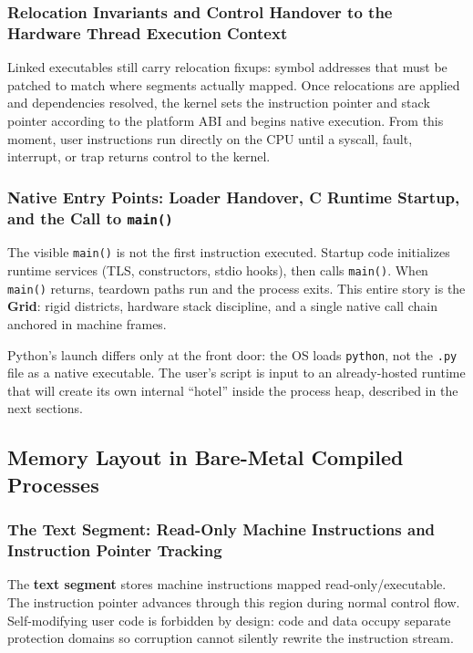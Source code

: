 \documentclass[a4paper,twoside]{report}
\begin{document}
\subsubsection{Relocation Invariants and Control Handover to the Hardware Thread Execution Context}

Linked executables still carry relocation fixups: symbol addresses that must be patched to match where segments actually mapped. Once relocations are applied and dependencies resolved, the kernel sets the instruction pointer and stack pointer according to the platform ABI and begins native execution. From this moment, user instructions run directly on the CPU until a syscall, fault, interrupt, or trap returns control to the kernel.

\subsubsection{Native Entry Points: Loader Handover, C Runtime Startup, and the Call to \texttt{main()}}

The visible \texttt{main()} is not the first instruction executed. Startup code initializes runtime services (TLS, constructors, stdio hooks), then calls \texttt{main()}. When \texttt{main()} returns, teardown paths run and the process exits. This entire story is the \textbf{Grid}: rigid districts, hardware stack discipline, and a single native call chain anchored in machine frames.

Python's launch differs only at the front door: the OS loads \texttt{python}, not the \texttt{.py} file as a native executable. The user's script is input to an already-hosted runtime that will create its own internal ``hotel'' inside the process heap, described in the next sections.


\subsection{Memory Layout in Bare-Metal Compiled Processes}

\subsubsection{The Text Segment: Read-Only Machine Instructions and Instruction Pointer Tracking}

The \textbf{text segment} stores machine instructions mapped read-only/executable. The instruction pointer advances through this region during normal control flow. Self-modifying user code is forbidden by design: code and data occupy separate protection domains so corruption cannot silently rewrite the instruction stream.
\end{document}
